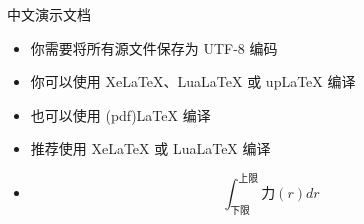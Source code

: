 \documentclass[UTF8]{ctexbeamer}
\begin{document}
\begin{frame}{中文演示文档}
\begin{itemize}
\item 你需要将所有源文件保存为 UTF-8 编码
\item 你可以使用 XeLaTeX、LuaLaTeX 或 upLaTeX 编译
\item 也可以使用 (pdf)LaTeX 编译
\item 推荐使用 XeLaTeX 或 LuaLaTeX 编译
\item \[  \int_{下限}^{上限} 力(r)dr  \]
\end{itemize}
\end{frame}
\end{document}
